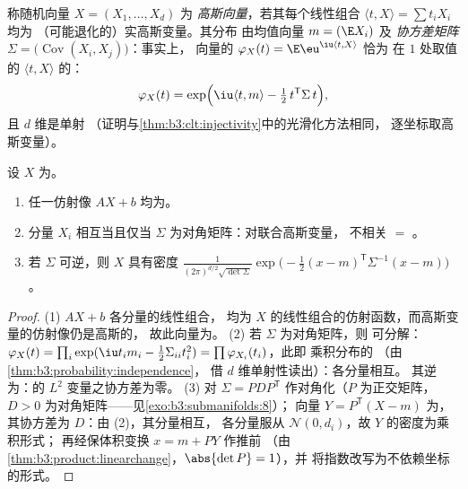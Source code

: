 \begin{definition}\label{def:b3:clt:gaussianvector}
称随机向量 $X = (X_1, \dots, X_d)$ 为
\emph{高斯向量}，若其每个线性组合
$\langle t, X\rangle = \sum t_iX_i$ 均为
（可能退化的）实高斯变量。其分布
由均值向量 $m = (\E X_i)$ 及
\emph{协方差矩阵} $\Sigma = \bigl(\operatorname{Cov}
(X_i, X_j)\bigr)$：事实上，
向量的 $\varphi_X(t) = \E\eu^{\iu\langle t, X\rangle}$ 恰为
在 $1$ 处取值的 $\langle t, X\rangle$ 的：
\[
\varphi_X(t) = \exp\Bigl(\iu\langle t, m\rangle -
\tfrac12\,t^{\mathsf T}\Sigma\,t\Bigr),
\]
且 $d$ 维是单射
（证明与\cref{thm:b3:clt:injectivity}中的光滑化方法相同，
逐坐标取高斯变量）。
\end{definition}

\begin{theorem}\label{thm:b3:clt:gaussianvector}
设 $X$ 为。
\begin{enumerate}
  \item 任一仿射像 $AX + b$ 均为。
  \item 分量 $X_i$ 相互\emph{}当且仅当
        $\Sigma$ 为对角矩阵：对联合高斯变量，
        不相关 $=$ 。
  \item 若 $\Sigma$ 可逆，则 $X$ 具有密度
        $\frac{1}{(2\pi)^{d/2}\sqrt{\det\Sigma}}
        \exp\bigl(-\frac12(x - m)^{\mathsf T}\Sigma^{-1}(x -
        m)\bigr)$。
\end{enumerate}
\end{theorem}

\begin{proof}
(1) $AX + b$ 各分量的线性组合，
均为 $X$ 的线性组合的仿射函数，而高斯变量的仿射像仍是高斯的，
故此向量为。
(2) 若 $\Sigma$ 为对角矩阵，则
可分解：$\varphi_X(t) = \prod_i\exp(\iu t_im_i -
\frac12\Sigma_{ii}t_i^2) = \prod\varphi_{X_i}(t_i)$，此即
乘积分布的
（由\cref{thm:b3:probability:independence}，
借 $d$ 维单射性读出）：各分量相互。
其逆为：的
$L^2$ 变量之协方差为零。
(3) 对 $\Sigma = P D P^{\mathsf T}$ 作对角化（$P$ 为正交矩阵，
$D > 0$ 为对角矩阵——见\cref{exo:b3:submanifolds:8}）；
向量 $Y = P^{\mathsf T}(X - m)$ 为，其协方差为
$D$：由 (2)，其分量相互，
各分量服从 $\mathcal N(0, d_i)$，故 $Y$ 的密度为乘积形式；
再经保体积变换 $x = m + PY$ 作推前
（由\cref{thm:b3:product:linearchange}，$\abs{\det P} = 1$），并
将指数改写为不依赖坐标的形式。
\end{proof}

